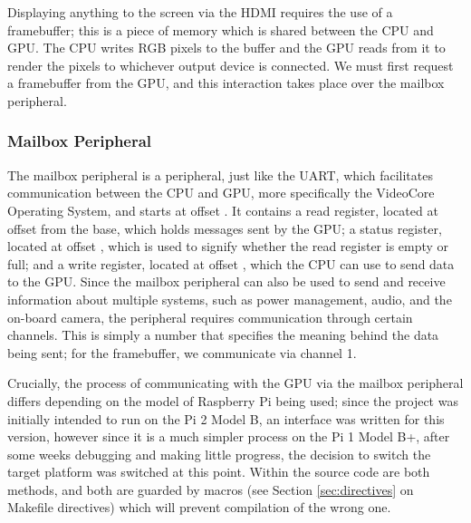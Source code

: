     Displaying anything to the screen via the HDMI requires the use of a
    framebuffer; this is a piece of memory which is shared between the CPU and
    GPU. The CPU writes RGB pixels to the buffer and the GPU reads from it to
    render the pixels to whichever output device is connected. We must first
    request a framebuffer from the GPU, and this interaction takes place over
    the mailbox peripheral.

    \subsubsection{Mailbox Peripheral}
        The mailbox peripheral is a peripheral, just like the UART, which
        facilitates communication between the CPU and GPU, more specifically the
        VideoCore Operating System, and starts at offset 
        \cite{Mailboxes}. It contains a read register, located at offset
         from the base, which holds messages sent by the GPU; a status
        register, located at offset , which is used to signify
        whether the read register is empty or full; and a write register,
        located at offset , which the CPU can use to send data to the
        GPU. Since the mailbox peripheral can also be used to send and receive
        information about multiple systems, such as power management, audio, and
        the on-board camera, the peripheral requires communication through
        certain channels. This is simply a number that specifies the meaning
        behind the data being sent; for the framebuffer, we communicate via
        channel 1.

        Crucially, the process of communicating with the GPU via the mailbox
        peripheral differs depending on the model of Raspberry Pi being used;
        since the project was initially intended to run on the Pi 2 Model B, an
        interface was written for this version, however since it is a much
        simpler process on the Pi 1 Model B+, after some weeks debugging and
        making little progress, the decision to switch the target platform was
        switched at this point. Within the source code are both methods,
        and both are guarded by macros (see Section \ref{sec:directives} on
        Makefile directives) which will prevent compilation of the wrong one.

